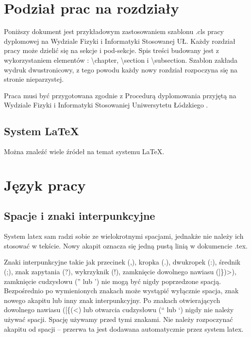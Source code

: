 \documentclass[twoside]{wfiisul}
\begin{document}


\nralbumu{****}
\specjalizacja{****}

\promotor{***}
\katedra{****}

\stronatytulowa


\chapter{Podział prac na rozdziały}

Poniższy dokument jest przykładowym zastosowaniem szablonu .cls pracy dyplomowej na Wydziale Fizyki i Informatyki Stosowanej UŁ. Każdy rozdział pracy może dzielić się na sekcje i pod-sekcje. Spis treści budowany jest z wykorzystaniem elementów : {\textbackslash}chapter, {\textbackslash}section i {\textbackslash}subsection. Szablon zakłada wydruk dwustronicowy, z tego powodu każdy nowy rozdział rozpoczyna się na stronie nieparzystej.

Praca musi być przygotowana zgodnie z Procedurą dyplomowania przyjętą na Wydziale Fizyki i Informatyki Stosowaniej Uniwersytetu Łódzkiego \cite{Procedura_dyplomowania}.
\section{System \LaTeX}
Można znaleźć wiele źródeł na temat systemu \LaTeX \cite{latex_wiki}.

\chapter{Język pracy}

\section{Spacje i znaki interpunkcyjne}
System latex sam radzi sobie ze wielokrotnymi spacjami, jednakże nie należy ich stosować w tekście. Nowy akapit oznacza się jedną pustą linią w dokumencie .tex. 

Znaki interpunkcyjne takie jak przecinek (,), kropka (.), dwukropek (:), średnik (;), znak zapytania (?), wykrzyknik (!), zamknięcie dowolnego nawiasu (]\})>), zamknięcie cudzysłowu ('' lub ') nie mogą być nigdy poprzedzone spacją. Bezpośrednio po wymienionych znakach może wystąpić wyłącznie spacja, znak nowego akapitu lub inny znak interpunkcyjny. Po znakach otwierających dowolnego nawiasu ([\{(<) lub otwarcia cudzysłowu (`` lub `) nigdy nie należy używać spacji. Spację używamy przed tymi znakami. Nie należy rozpoczynać akapitu od spacji – przerwa ta jest dodawana  automatycznie przez system latex.
\end{document}

